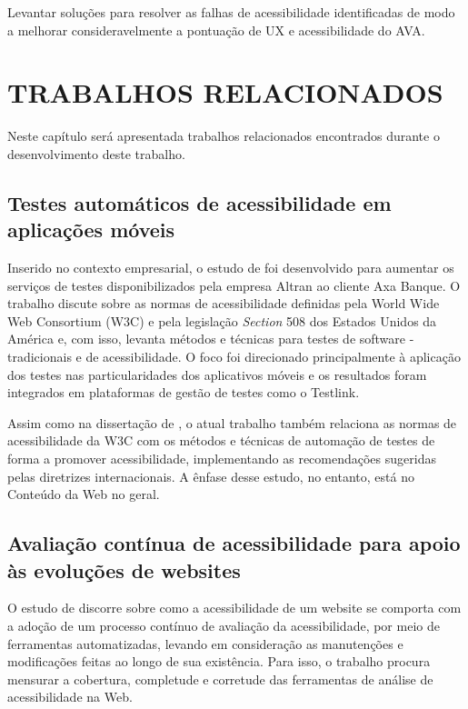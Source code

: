\documentclass[
	12pt,				%
	openright,			%
	oneside,			%
	a4paper,			%
	chapter=TITLE,		%
	section=TITLE,		%
	subsection=TITLE,	%
	subsubsection=TITLE,%
	english,			%
	brazil				%
	]{abntex2}
\theoremstyle{definition}
\begin{document}
Levantar soluções para resolver as falhas de acessibilidade identificadas de modo a melhorar consideravelmente a pontuação de UX e acessibilidade do AVA.
    


\chapter{TRABALHOS RELACIONADOS}

Neste capítulo será apresentada trabalhos relacionados encontrados durante o desenvolvimento deste trabalho.

\section{Testes automáticos de acessibilidade em aplicações móveis} 

Inserido no contexto empresarial, o estudo de \cite{chantre2015testes} foi desenvolvido para aumentar os serviços de testes disponibilizados pela empresa Altran ao cliente Axa Banque. O trabalho discute sobre as normas de acessibilidade definidas pela World Wide Web Consortium (W3C) e pela legislação \textit{Section} 508 dos Estados Unidos da América e, com isso, levanta métodos e técnicas para testes de software - tradicionais e de acessibilidade. O foco foi direcionado principalmente à aplicação dos testes nas particularidades dos aplicativos móveis e os resultados foram integrados em plataformas de gestão de testes como o Testlink.

Assim como na dissertação de \cite{chantre2015testes}, o atual trabalho também relaciona as normas de acessibilidade da W3C com os métodos e técnicas de automação de testes de forma a promover acessibilidade, implementando as recomendações sugeridas pelas diretrizes internacionais. A ênfase desse estudo, no entanto, está no Conteúdo da Web no geral.

\section{Avaliação contínua de acessibilidade para apoio às evoluções de websites} 

O estudo de \cite{silva2017avaliaccao} discorre sobre como a acessibilidade de um website se comporta com a adoção de um processo contínuo de avaliação da acessibilidade, por meio de ferramentas automatizadas, levando em consideração as manutenções e modificações feitas ao longo de sua existência. Para isso, o trabalho procura mensurar a cobertura, completude e corretude das ferramentas de análise de acessibilidade na Web.
\end{document}
